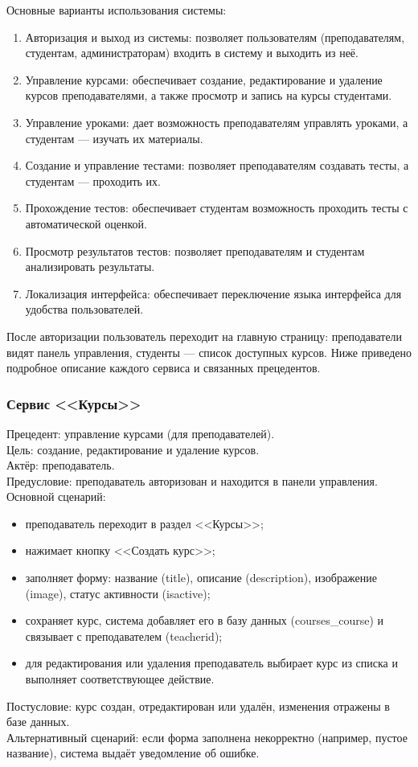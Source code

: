 Основные варианты использования системы:

\begin{enumerate}
	\item {Авторизация и выход из системы}: позволяет пользователям (преподавателям, студентам, администраторам) входить в систему и выходить из неё.
	\item {Управление курсами}: обеспечивает создание, редактирование и удаление курсов преподавателями, а также просмотр и запись на курсы студентами.
	\item {Управление уроками}: дает возможность преподавателям управлять уроками, а студентам --- изучать их материалы.
	\item {Создание и управление тестами}: позволяет преподавателям создавать тесты, а студентам --- проходить их.
	\item {Прохождение тестов}: обеспечивает студентам возможность проходить тесты с автоматической оценкой.
	\item {Просмотр результатов тестов}: позволяет преподавателям и студентам анализировать результаты.
	\item {Локализация интерфейса}: обеспечивает переключение языка интерфейса для удобства пользователей.
\end{enumerate}

После авторизации пользователь переходит на главную страницу: преподаватели видят панель управления, студенты --- список доступных курсов. Ниже приведено подробное описание каждого сервиса и связанных прецедентов.


\subsubsection{Сервис <<Курсы>>}
	{Прецедент: управление курсами (для преподавателей)}. \\
	{Цель}: создание, редактирование и удаление курсов. \\
	{Актёр}: преподаватель. \\
	{Предусловие}: преподаватель авторизован и находится в панели управления. \\
	{Основной сценарий}:
	\begin{itemize}
		\item преподаватель переходит в раздел <<Курсы>>;
		\item нажимает кнопку <<Создать курс>>;
		\item заполняет форму: название (title), описание (description), изображение (image), статус активности (isactive);
		\item сохраняет курс, система добавляет его в базу данных (courses\_course) и связывает с преподавателем (teacherid);
		\item для редактирования или удаления преподаватель выбирает курс из списка и выполняет соответствующее действие.
	\end{itemize}
	{Постусловие}: курс создан, отредактирован или удалён, изменения отражены в базе данных. \\
	{Альтернативный сценарий}: если форма заполнена некорректно (например, пустое название), система выдаёт уведомление об ошибке.
	
